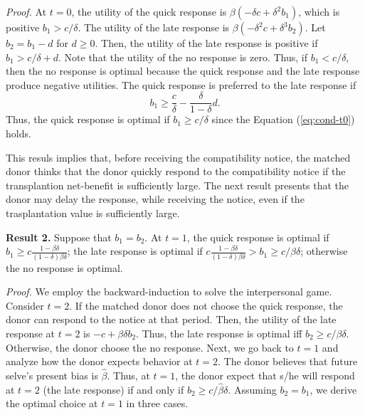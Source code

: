 \documentclass[
  12pt,
]{article}
\begin{document}
\noindent
\emph{Proof.} At \(t=0\), the utility of the quick response is \(\beta(-\delta c + \delta^2 b_1)\), which is positive \(b_1 > c / \delta\). The utility of the late response is \(\beta(-\delta^2 c + \delta^3 b_2)\). Let \(b_2 = b_1 - d\) for \(d \ge 0\). Then, the utility of the late response is positive if \(b_1 > c/\delta + d\). Note that the utility of the no response is zero. Thus, if \(b_1 < c/\delta\), then the no response is optimal because the quick response and the late response produce negative utilities. The quick response is preferred to the late response if
\begin{equation}
  b_1 \ge \frac{c}{\delta} - \frac{\delta}{1-\delta}d. \label{eq:cond-t0}
\end{equation}
Thus, the quick response is optimal if \(b_1 \ge c/\delta\) since the Equation (\ref{eq:cond-t0}) holds.

This resuls implies that, before receiving the compatibility notice, the matched donor thinks that the donor quickly respond to the compatibility notice if the transplantion net-benefit is sufficiently large. The next result presents that the donor may delay the response, while receiving the notice, even if the trasplantation value is sufficiently large.

\noindent
\textbf{Result 2.} Suppose that \(b_1 = b_2\). At \(t=1\), the quick response is optimal if \(b_1 \ge c \frac{1-\beta\delta}{(1-\delta)\beta\delta}\); the late response is optimal if \(c \frac{1-\beta\delta}{(1-\delta)\beta\delta} > b_1 \ge c/\beta\delta\); otherwise the no response is optimal.

\noindent
\emph{Proof.} We employ the backward-induction to solve the interpersonal game. Consider \(t=2\). If the matched donor does not choose the quick response, the donor can respond to the notice at that period. Then, the utility of the late response at \(t=2\) is \(-c + \beta\delta b_2\). Thus, the late response is optimal iff \(b_2 \ge c/\beta\delta\). Otherwise, the donor choose the no response. Next, we go back to \(t=1\) and analyze how the donor expects behavior at \(t=2\). The donor believes that future selve's present bias is \(\hat{\beta}\). Thus, at \(t = 1\), the donor expect that s/he will respond at \(t = 2\) (the late response) if and only if \(b_2 \ge c/\hat{\beta}\delta\). Assuming \(b_2 = b_1\), we derive the optimal choice at \(t=1\) in three cases.
\end{document}
